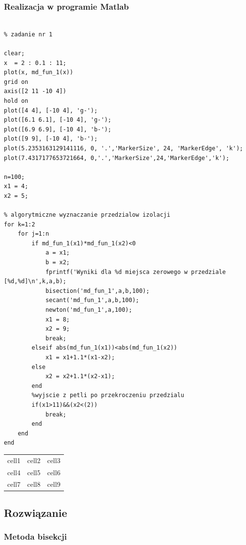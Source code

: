 \documentclass[11pt, oneside]{article}   	%
\begin{document}
\subsubsection{Realizacja w programie Matlab}
\begin{lstlisting}[caption=Skrypt rozwiązujący zadanie nr 1]

% zadanie nr 1

clear; 
x  = 2 : 0.1 : 11;
plot(x, md_fun_1(x))
grid on
axis([2 11 -10 4])
hold on
plot([4 4], [-10 4], 'g-');
plot([6.1 6.1], [-10 4], 'g-');
plot([6.9 6.9], [-10 4], 'b-');
plot([9 9], [-10 4], 'b-');
plot(5.2353163129141116, 0, '.','MarkerSize', 24, 'MarkerEdge', 'k');
plot(7.4317177653721664, 0,'.','MarkerSize',24,'MarkerEdge','k');

n=100; 
x1 = 4; 
x2 = 5; 

% algorytmiczne wyznaczanie przedzialow izolacji
for k=1:2
    for j=1:n
        if md_fun_1(x1)*md_fun_1(x2)<0
            a = x1;
            b = x2;
            fprintf('Wyniki dla %d miejsca zerowego w przedziale [%d,%d]\n',k,a,b);
            bisection('md_fun_1',a,b,100);
            secant('md_fun_1',a,b,100);
            newton('md_fun_1',a,100);
            x1 = 8; 
            x2 = 9; 
            break;
        elseif abs(md_fun_1(x1))<abs(md_fun_1(x2))
            x1 = x1+1.1*(x1-x2);
        else
            x2 = x2+1.1*(x2-x1);
        end
        %wyjscie z petli po przekroczeniu przedzialu
        if(x1>11)&&(x2<(2))
            break; 
        end
    end
end

\end{lstlisting}

\begin{center}
\begin{tabular}{ c c c }
 cell1 & cell2 & cell3 \\ 
 cell4 & cell5 & cell6 \\  
 cell7 & cell8 & cell9    
\end{tabular}
\end{center}

\subsection{Rozwiązanie}
\subsubsection{Metoda bisekcji}
\end{document}
